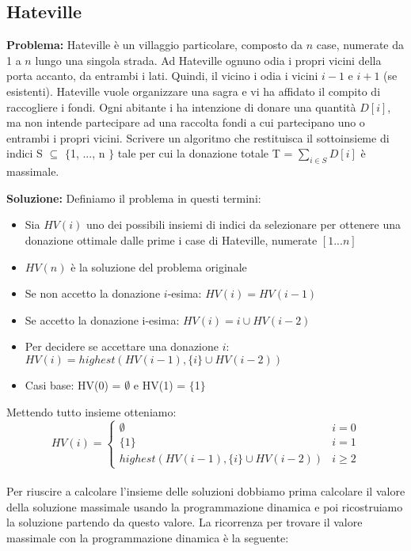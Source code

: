 \documentclass[../cheatSheetAlgoritmi.tex]{subfiles}
\begin{document}
\subsection{Hateville}
\textbf{Problema:} Hateville è un villaggio particolare, composto da $n$ case, numerate da 1 a $n$ lungo una singola strada. Ad Hateville ognuno odia i propri vicini della porta accanto, da entrambi i lati. Quindi, il vicino i odia i vicini $i-1$ e $i+1$ (se esistenti).
Hateville vuole organizzare una sagra e vi ha affidato il compito di
raccogliere i fondi. Ogni abitante i ha intenzione di donare una quantità $D[i]$, ma non intende partecipare ad una raccolta fondi a cui partecipano uno o entrambi i propri vicini. Scrivere un algoritmo che restituisca il sottoinsieme di indici S  $\subseteq$ $\{$1, ..., n $\}$ tale per cui la donazione totale T = $\sum\limits_{i \in S} {D[i]}$ è massimale. 
\newpage
\begin{flushleft}
\textbf{Soluzione:} Definiamo il problema in questi termini: 
\end{flushleft}
\begin{itemize}
	\item Sia $HV(i)$ uno dei possibili insiemi di indici da selezionare per ottenere una donazione ottimale dalle prime i case di Hateville, numerate $[1...n]$
	\item $HV(n)$ è la soluzione del problema originale
	\item Se non accetto la donazione $i$-esima: $HV(i) = HV(i-1)$
	\item Se accetto la donazione i-esima: $HV(i) = i \cup HV(i-2)$
	\item Per decidere se accettare una donazione $i$: $HV(i) = highest(HV(i -1),  \{i\} \cup HV(i-2))$
	\item Casi base: HV(0) = $\emptyset$ e HV(1) = $\{$1$\}$ 
\end{itemize} 
Mettendo tutto insieme otteniamo:
\begin{equation*}
  	HV(i) =\begin{cases}
    	\emptyset & \text{$i = 0$}\\
    	\{1\} & \text{$i = 1$}\\
    	highest(HV(i -1), \{i\} \cup HV(i-2)) & \text{$i \ge 2$}
  	\end{cases}
\end{equation*} \\
Per riuscire a calcolare l'insieme delle soluzioni dobbiamo prima calcolare il valore della soluzione massimale usando la programmazione dinamica e poi ricostruiamo la soluzione partendo da questo valore. La ricorrenza per trovare il valore massimale con la programmazione dinamica è la seguente:
\end{document}
